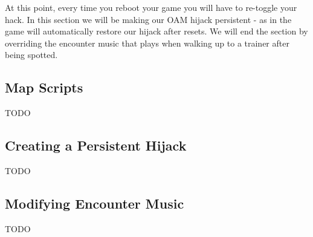 \documentclass[../main.tex]{subfile}
\begin{document}
    At this point, every time you reboot your game you will have to re-toggle your hack.  In this section we will be making our OAM hijack persistent - as in the game will automatically restore our hijack after resets.  We will end the section by overriding the encounter music that plays when walking up to a trainer after being spotted.

    \subsection{Map Scripts}
    TODO

    \subsection{Creating a Persistent Hijack}
    TODO

    \subsection{Modifying Encounter Music}
    TODO
\end{document}
